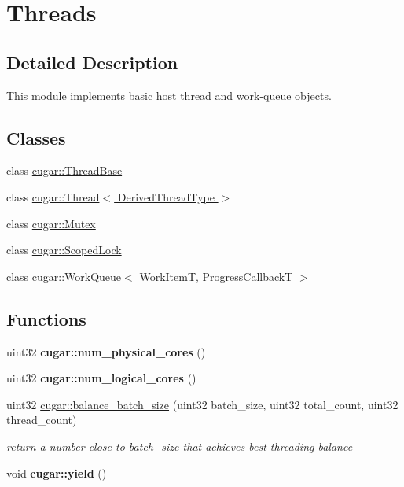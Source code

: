 \hypertarget{group___threads}{}\section{Threads}
\label{group___threads}


\subsection{Detailed Description}
This module implements basic host thread and work-\/queue objects. \subsection*{Classes}
\begin{DoxyCompactItemize}
\item 
class \hyperlink{classcugar_1_1_thread_base}{cugar\+::\+Thread\+Base}
\item 
class \hyperlink{classcugar_1_1_thread}{cugar\+::\+Thread$<$ Derived\+Thread\+Type $>$}
\item 
class \hyperlink{classcugar_1_1_mutex}{cugar\+::\+Mutex}
\item 
class \hyperlink{classcugar_1_1_scoped_lock}{cugar\+::\+Scoped\+Lock}
\item 
class \hyperlink{classcugar_1_1_work_queue}{cugar\+::\+Work\+Queue$<$ Work\+Item\+T, Progress\+Callback\+T $>$}
\end{DoxyCompactItemize}
\subsection*{Functions}
\begin{DoxyCompactItemize}
\item 
\mbox{\label{group___threads_ga897e37d326e8d86f61cb8d967bdbd539}} 
uint32 {\bfseries cugar\+::num\+\_\+physical\+\_\+cores} ()
\item 
\mbox{\label{group___threads_ga0ca3bd554490bbc2aaa120320f588d79}} 
uint32 {\bfseries cugar\+::num\+\_\+logical\+\_\+cores} ()
\item 
\mbox{\label{group___threads_gabd840f91a015ca8c052ba4601fda2a73}} 
uint32 \hyperlink{group___threads_gabd840f91a015ca8c052ba4601fda2a73}{cugar\+::balance\+\_\+batch\+\_\+size} (uint32 batch\+\_\+size, uint32 total\+\_\+count, uint32 thread\+\_\+count)
\begin{DoxyCompactList}\small\item\em return a number close to batch\+\_\+size that achieves best threading balance \end{DoxyCompactList}\item 
\mbox{\label{group___threads_ga3a367b425880556896d91533bf34befe}} 
void {\bfseries cugar\+::yield} ()
\end{DoxyCompactItemize}
